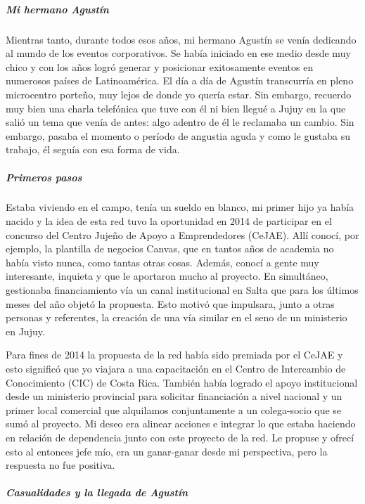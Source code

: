 \documentclass[
]{article}
\begin{document}
\hypertarget{mi-hermano-agustuxedn}{%
\subparagraph{Mi hermano Agustín}\label{mi-hermano-agustuxedn}}

Mientras tanto, durante todos esos años, mi hermano Agustín se venía
dedicando al mundo de los eventos corporativos. Se había iniciado en ese
medio desde muy chico y con los años logró generar y posicionar
exitosamente eventos en numerosos países de Latinoamérica. El día a día
de Agustín transcurría en pleno microcentro porteño, muy lejos de donde
yo quería estar. Sin embargo, recuerdo muy bien una charla telefónica
que tuve con él ni bien llegué a Jujuy en la que salió un tema que venía
de antes: algo adentro de él le reclamaba un cambio. Sin embargo, pasaba
el momento o período de angustia aguda y como le gustaba su trabajo, él
seguía con esa forma de vida.

\hypertarget{primeros-pasos}{%
\subparagraph{Primeros pasos}\label{primeros-pasos}}

Estaba viviendo en el campo, tenía un sueldo en blanco, mi primer hijo
ya había nacido y la idea de esta red tuvo la oportunidad en 2014 de
participar en el concurso del Centro Jujeño de Apoyo a Emprendedores
(CeJAE). Allí conocí, por ejemplo, la plantilla de negocios Canvas, que
en tantos años de academia no había visto nunca, como tantas otras
cosas. Además, conocí a gente muy interesante, inquieta y que le
aportaron mucho al proyecto. En simultáneo, gestionaba financiamiento
vía un canal institucional en Salta que para los últimos meses del año
objetó la propuesta. Esto motivó que impulsara, junto a otras personas y
referentes, la creación de una vía similar en el seno de un ministerio
en Jujuy.

Para fines de 2014 la propuesta de la red había sido premiada por el
CeJAE y esto significó que yo viajara a una capacitación en el Centro de
Intercambio de Conocimiento (CIC) de Costa Rica. También había logrado
el apoyo institucional desde un ministerio provincial para solicitar
financiación a nivel nacional y un primer local comercial que alquilamos
conjuntamente a un colega-socio que se sumó al proyecto. Mi deseo era
alinear acciones e integrar lo que estaba haciendo en relación de
dependencia junto con este proyecto de la red. Le propuse y ofrecí esto
al entonces jefe mío, era un ganar-ganar desde mi perspectiva, pero la
respuesta no fue positiva.

\hypertarget{casualidades-y-la-llegada-de-agustuxedn}{%
\subparagraph{Casualidades y la llegada de
Agustín}\label{casualidades-y-la-llegada-de-agustuxedn}}
\end{document}
